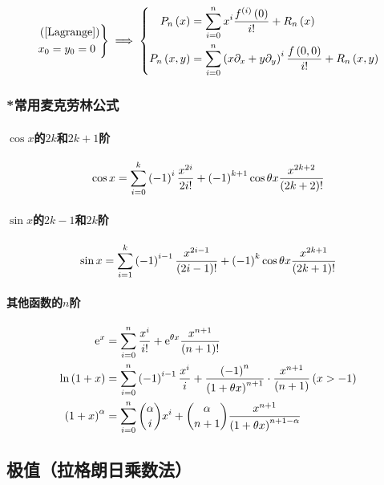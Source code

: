\documentclass{article}
\begin{document}
\[\left.\begin{aligned}
         & \left(\ref{Lagrange}\right) \\
         & x_0=y_0=0
    \end{aligned}\right\}
    \implies
    \left\{\begin{aligned}
        P_n\left(x\right)   & =\sum_{i=0}^nx^i\frac{f^{\left(i\right)}\left(0\right)}{i!}+R_n\left(x\right)                       \\
        P_n\left(x,y\right) & =\sum_{i=0}^n\left(x\partial_x+y\partial_y\right)^i\frac{f\left(0,0\right)}{i!}+R_n\left(x,y\right)
    \end{aligned}\right.\]

\subsubsection{*常用麦克劳林公式}

\paragraph{$\cos x$的$2k$和$2k+1$阶}

\[\cos x=\sum_{i=0}^k\left(-1\right)^i\frac{x^{2i}}{2i!}+\left(-1\right)^{k+1}\cos\theta x\frac{x^{2k+2}}{\left(2k+2\right)!}\]

\paragraph{$\sin x$的$2k-1$和$2k$阶}

\[\sin x=\sum_{i=1}^k\left(-1\right)^{i-1}\frac{x^{2i-1}}{\left(2i-1\right)!}+\left(-1\right)^k\cos\theta x\frac{x^{2k+1}}{\left(2k+1\right)!}\]

\paragraph{其他函数的$n$阶}

\[\begin{aligned}
        \mathrm e^x           & =\sum_{i=0}^n\frac{x^i}{i!}+\mathrm e^{\theta x}\frac{x^{n+1}}{\left(n+1\right)!}                                                \\
        \ln\left(1+x\right)     & =\sum_{i=0}^n\left(-1\right)^{i-1}\frac{x^i}{i}+\frac{\left(-1\right)^n}{\left(1+\theta x\right)^{n+1}}\cdot\frac{x^{n+1}}{\left(n+1\right)}\left(x>-1\right) \\
        \left(1+x\right)^\alpha & =\sum_{i=0}^n\binom \alpha ix^i+\binom \alpha{n+1}\frac{x^{n+1}}{\left(1+\theta x\right)^{n+1-\alpha}}
    \end{aligned}\]

\subsection{极值（拉格朗日乘数法）}
\end{document}
